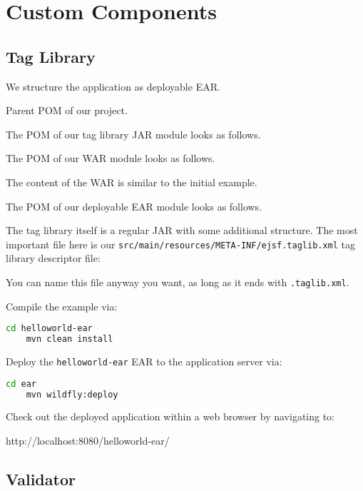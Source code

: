 %

\chapter{Custom Components}

\section{Tag Library}

We structure the application as deployable EAR.

Parent POM of our project.


The POM of our tag library JAR module looks as follows.


The POM of our WAR module looks as follows.


The content of the WAR is similar to the initial example.

The POM of our deployable EAR module looks as follows.


The tag library itself is a regular JAR with some additional structure.
The most important file here is our \texttt{src/main/resources/META-INF/ejsf.taglib.xml} tag library descriptor file:

You can name this file anyway you want, as long as it ends with \texttt{.taglib.xml}.

Compile the example via:
\begin{lstlisting}[language=bash]
	cd helloworld-ear
	mvn clean install
\end{lstlisting}

Deploy the \texttt{helloworld-ear} EAR to the application server via:
\begin{lstlisting}[language=bash]
	cd ear
	mvn wildfly:deploy
\end{lstlisting}

Check out the deployed application within a web browser by navigating to:

http://localhost:8080/helloworld-ear/

\section{Validator}

